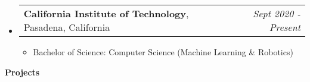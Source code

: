 \documentclass[letterpaper,11pt]{article}
\makeatletter
\newcommand{\resitem}[1]{\item #1 \vspace{-3pt}}
\newcommand{\resheading}[1]{{\large \colorbox{mygrey}{\begin{minipage}{\textwidth}{\textbf{#1 \vphantom{p\^{E}}}}\end{minipage}}}}
\newcommand{\edusubheading}[3]{
	\begin{tabular*}{7.0in}{l@{\extracolsep{\fill}}r}
		\textbf{#1}, #2 & \textit{#3} \\
\end{tabular*}\vspace{-6pt}}
\makeatother
\begin{document}
\begin{itemize}

\item
	\edusubheading{California Institute of Technology}{Pasadena, California}{Sept 2020 - Present}
		\begin{itemize}
			\resitem{Bachelor of Science: Computer Science (Machine Learning \& Robotics)}
		\end{itemize}

\end{itemize}

\vspace{6pt}

\resheading{Projects}
\end{document}
